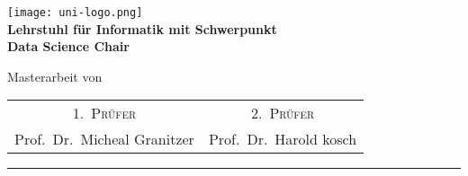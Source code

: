 \begin{titlepage}
    \centering
    \begin{onehalfspace}
    	\begin{german}
        	\texttt{[image: uni-logo.png]}\\
        	\vspace{1.0cm}
        	\large {\bfseries Lehrstuhl für Informatik mit Schwerpunkt\\ \textenglish{Data Science Chair}} \\

        	\vspace{2.5cm}

            \begin{doublespace}
            	\textenglish{\textsf{\Huge{\thetitle}}}
            \end{doublespace}

        	\vspace{2cm}

            \Large{Masterarbeit von}\\

        	\vspace{1cm}

        	{\bfseries \large{\theauthor}}
            

        	\vfill

        	{\large
        		\begin{tabular}[l]{cc}
        			\textsc{1.~Prüfer} & \textsc{2.~Prüfer} \\
        			Prof.~Dr.~Micheal Granitzer & Prof.~Dr.~Harold kosch
        		\end{tabular}
        	}

        	\vspace{1.5cm}

        	\parbox{\linewidth}{\hrule\strut}

            \vfill

	    \textgerman{\thedate}
    	\end{german}
    \end{onehalfspace}
\end{titlepage}
